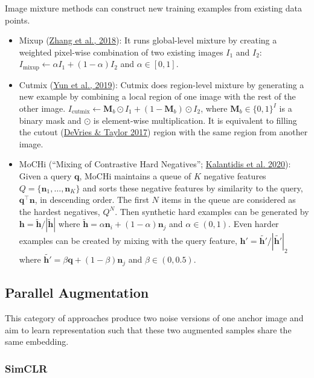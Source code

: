 \documentclass[12pt]{article}
\begin{document}
Image mixture methods can construct new training examples from existing data points.
\begin{itemize}
    \item Mixup (\href{https://arxiv.org/abs/1710.09412}{Zhang et al., 2018}): It runs global-level mixture by creating a weighted pixel-wise combination of two existing images $I_1$ and $I_2$: $I_\text{mixup} \gets \alpha I_1 + (1-\alpha) I_2$ and $\alpha \in [0, 1]$.
    \item Cutmix (\href{https://arxiv.org/abs/1905.04899}{Yun et al., 2019}): Cutmix does region-level mixture by generating a new example by combining a local region of one image with the rest of the other image. $I_\text{cutmix} \gets \mathbf{M}_b \odot I_1 + (1-\mathbf{M}_b) \odot I_2$, where $\mathbf{M}_b \in \{0, 1\}^I$ is a binary mask and $\odot$ is element-wise multiplication. It is equivalent to filling the cutout (\href{https://arxiv.org/abs/1708.04552}{DeVries \& Taylor 2017}) region with the same region from another image.
    \item MoCHi (``Mixing of Contrastive Hard Negatives''; \href{https://arxiv.org/abs/2010.01028}{Kalantidis et al. 2020}): Given a query $\mathbf{q}$, MoCHi maintains a queue of $K$ negative features $Q=\{\mathbf{n}_1, \dots, \mathbf{n}_K \}$ and sorts these negative features by similarity to the query, $\mathbf{q}^\top \mathbf{n}$, in descending order. The first $N$ items in the queue are considered as the hardest negatives, $Q^N$. Then synthetic hard examples can be generated by $\mathbf{h} = \tilde{\mathbf{h}} / |\tilde{\mathbf{h}}|$ where $\tilde{\mathbf{h}} = \alpha\mathbf{n}_i + (1-\alpha) \mathbf{n}_j$ and $\alpha \in (0, 1)$. Even harder examples can be created by mixing with the query feature, $\mathbf{h}' = \tilde{\mathbf{h}'} / |\tilde{\mathbf{h}'}|_2$ where $\tilde{\mathbf{h}'} = \beta\mathbf{q} + (1-\beta) \mathbf{n}_j$ and $\beta \in (0, 0.5)$.
\end{itemize}

\subsection{Parallel Augmentation}

This category of approaches produce two noise versions of one anchor image and aim to learn representation such that these two augmented samples share the same embedding.

\subsubsection{SimCLR}
\end{document}
